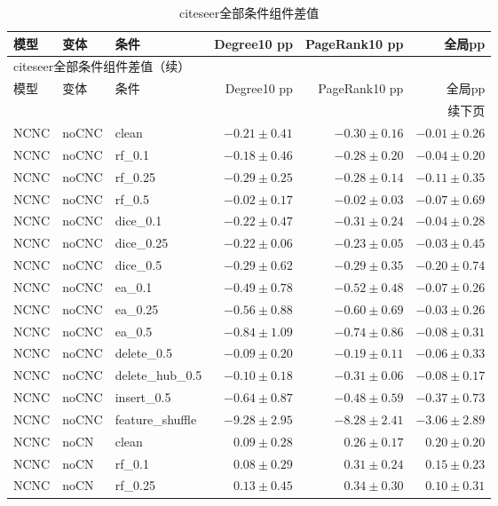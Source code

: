 \documentclass[UTF8,a4paper,11pt,fontset=fandol]{ctexart}
\begin{document}
{\footnotesize
\setlength{\tabcolsep}{3pt}
\begin{longtable}{lllrrr}
\caption{citeseer全部条件组件差值}\\
\toprule
模型 & 变体 & 条件 & Degree10 pp & PageRank10 pp & 全局pp \\
\midrule
\endfirsthead
\multicolumn{6}{l}{citeseer全部条件组件差值（续）}\\
\toprule
模型 & 变体 & 条件 & Degree10 pp & PageRank10 pp & 全局pp \\
\midrule
\endhead
\midrule\multicolumn{6}{r}{续下页}\\
\endfoot
\bottomrule\endlastfoot
NCNC & noCNC & clean & $-0.21\pm0.41$ & $-0.30\pm0.16$ & $-0.01\pm0.26$ \\
NCNC & noCNC & rf\_0.1 & $-0.18\pm0.46$ & $-0.28\pm0.20$ & $-0.04\pm0.20$ \\
NCNC & noCNC & rf\_0.25 & $-0.29\pm0.25$ & $-0.28\pm0.14$ & $-0.11\pm0.35$ \\
NCNC & noCNC & rf\_0.5 & $-0.02\pm0.17$ & $-0.02\pm0.03$ & $-0.07\pm0.69$ \\
NCNC & noCNC & dice\_0.1 & $-0.22\pm0.47$ & $-0.31\pm0.24$ & $-0.04\pm0.28$ \\
NCNC & noCNC & dice\_0.25 & $-0.22\pm0.06$ & $-0.23\pm0.05$ & $-0.03\pm0.45$ \\
NCNC & noCNC & dice\_0.5 & $-0.29\pm0.62$ & $-0.29\pm0.35$ & $-0.20\pm0.74$ \\
NCNC & noCNC & ea\_0.1 & $-0.49\pm0.78$ & $-0.52\pm0.48$ & $-0.07\pm0.26$ \\
NCNC & noCNC & ea\_0.25 & $-0.56\pm0.88$ & $-0.60\pm0.69$ & $-0.03\pm0.26$ \\
NCNC & noCNC & ea\_0.5 & $-0.84\pm1.09$ & $-0.74\pm0.86$ & $-0.08\pm0.31$ \\
NCNC & noCNC & delete\_0.5 & $-0.09\pm0.20$ & $-0.19\pm0.11$ & $-0.06\pm0.33$ \\
NCNC & noCNC & delete\_hub\_0.5 & $-0.10\pm0.18$ & $-0.31\pm0.06$ & $-0.08\pm0.17$ \\
NCNC & noCNC & insert\_0.5 & $-0.64\pm0.87$ & $-0.48\pm0.59$ & $-0.37\pm0.73$ \\
NCNC & noCNC & feature\_shuffle & $-9.28\pm2.95$ & $-8.28\pm2.41$ & $-3.06\pm2.89$ \\
NCNC & noCN & clean & $0.09\pm0.28$ & $0.26\pm0.17$ & $0.20\pm0.20$ \\
NCNC & noCN & rf\_0.1 & $0.08\pm0.29$ & $0.31\pm0.24$ & $0.15\pm0.23$ \\
NCNC & noCN & rf\_0.25 & $0.13\pm0.45$ & $0.34\pm0.30$ & $0.10\pm0.31$ \\

\end{longtable}}
\end{document}
